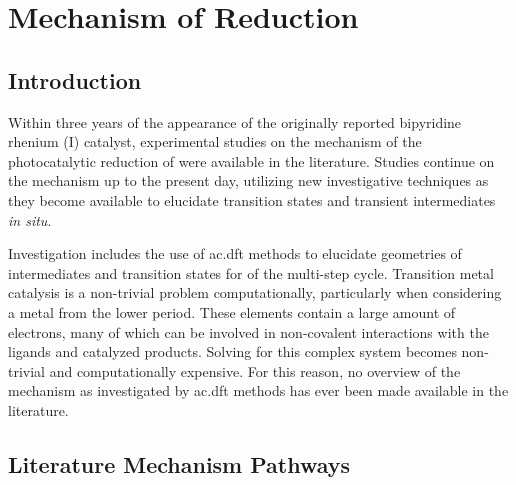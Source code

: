\chapter{Mechanism of \texorpdfstring{}{CO2} Reduction}\label{chap.mech}

\section{Introduction}

Within three years of the appearance of the originally reported bipyridine rhenium (I) catalyst, experimental studies on the mechanism of the photocatalytic reduction of  were available in the literature\autocite{hawecker1986}. Studies continue on the mechanism up to the present day\autocite{johnson1996, koike2002, smieja2012, machan2014, kou2014}, utilizing new investigative techniques as they become available to elucidate transition states and transient intermediates \textit{in situ}. 

Investigation includes the use of \gls{ac.dft} methods to elucidate geometries of intermediates and transition states for of the multi-step cycle. Transition metal catalysis is a non-trivial problem computationally, particularly when considering a metal from the lower period. These elements contain a large amount of electrons, many of which can be involved in non-covalent interactions with the ligands and catalyzed products. Solving for this complex system becomes non-trivial and computationally expensive. For this reason, no overview of the mechanism as investigated by \gls{ac.dft} methods has ever been made available in the literature. 

\section{Literature Mechanism Pathways}

